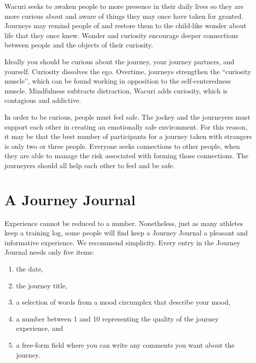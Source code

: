 \documentclass[12pt]{book}
\begin{document}
Wacuri seeks to awaken people to more presence in their daily lives so they are more curious about and aware of things they may once have taken for granted. Journeys may remind people of and restore them to the child-like wonder about life that they once knew. Wonder and curiosity encourage deeper connections between people and the objects of their curiosity.
					
Ideally you should be curious about the journey, your journey partners, and yourself. Curiosity dissolves the ego. Overtime, journeys strengthen the “curiosity muscle”, which can be found working in opposition to the self-centeredness muscle. Mindfulness subtracts distraction, Wacuri adds curiosity, which is contagious and addictive.
					
In order to be curious, people must feel safe. The jockey and the journeyers must support each other in creating an emotionally safe environment. For this reason, it may be that the best number of participants for a journey taken with strangers is only two or three people. Everyone seeks connections to other people, when they are able to manage the risk associated with forming those connections. The journeyers should all help each other to feel and be safe.


\chapter{A Journey Journal}

Experience cannot be reduced to a number.  Nonetheless, just
as many athletes keep a training log, some people will find
keep a Journey Journal a pleasant and informative experience.
We recommend simplicity. Every entry in the Journey Journal
needs only five items:
\begin{enumerate}
\item the date,
\item the journey title,
\item a selection of words from a mood circumplex that
  describe your mood,
\item a number between 1 and 10 representing the quality of
  the journey experience, and
\item a free-form field where you can write any comments
  you want about the journey.
\end{enumerate}
\end{document}
